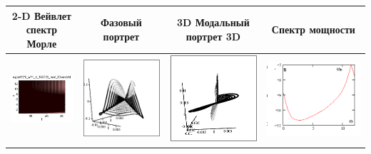 \documentclass[12pt,letterpaper]{extreport}
\begin{document}
\begin{table}[H]
{\begin{tabular}{|c|c|c|c|}
\hline
\footnotesize 2-D Вейвлет спектр Морле&
\footnotesize Фазовый 
портрет&\footnotesize 3D Модальный портрет 3D&
\footnotesize Спектр мощности\\
\hline
	\includegraphics[scale=1]{b1} 	
	&	
	\includegraphics[scale=0.9]{b2} 	
	&	
	\includegraphics[scale=0.9]{b3} 
	&
	\includegraphics[scale=0.9]{b4} 
\\
\hline


\end{tabular}}
\end{table}
\end{document}
